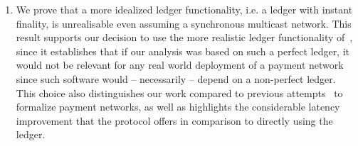 \begin{enumerate}
\item We prove that a more idealized ledger functionality, i.e. a ledger with
instant finality, is unrealisable even assuming a synchronous multicast network.
This result supports our decision to use the more realistic ledger functionality
of~\cite{BMTZ17}, since it establishes that if our analysis was based on such a
perfect ledger, it would not be relevant for any real world deployment of a
payment network since such software would -- necessarily -- depend on a
non-perfect ledger. This choice also distinguishes our work compared to previous
attempts~\cite{DBLP:conf/ccs/DziembowskiFH18,Malavolta:2017:CPP:3133956.3134096,sprites,perun}
to formalize payment networks, as well as highlights the considerable
latency improvement that the  protocol offers in comparison to directly
using the ledger.
\end{enumerate}

